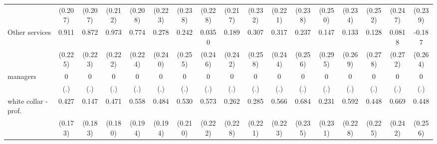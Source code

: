 {\begin{tabular}{l*{16}{c}}
                    &     (0.207)         &     (0.207)         &     (0.212)         &     (0.208)         &     (0.223)         &     (0.238)         &     (0.228)         &     (0.217)         &     (0.232)         &     (0.221)         &     (0.238)         &     (0.250)         &     (0.234)         &     (0.252)         &     (0.247)         &     (0.239)         \\
[1em]
Other services      &       0.911\sym{***}&       0.872\sym{***}&       0.973\sym{***}&       0.774\sym{***}&       0.278         &       0.242         &      0.0350         &       0.189         &       0.307         &       0.317         &       0.237         &       0.147         &       0.133         &       0.128         &      0.0818         &      -0.187         \\
                    &     (0.225)         &     (0.223)         &     (0.222)         &     (0.224)         &     (0.240)         &     (0.255)         &     (0.246)         &     (0.242)         &     (0.258)         &     (0.244)         &     (0.256)         &     (0.295)         &     (0.269)         &     (0.278)         &     (0.272)         &     (0.264)         \\
[1em]
managers            &           0         &           0         &           0         &           0         &           0         &           0         &           0         &           0         &           0         &           0         &           0         &           0         &           0         &           0         &           0         &           0         \\
                    &         (.)         &         (.)         &         (.)         &         (.)         &         (.)         &         (.)         &         (.)         &         (.)         &         (.)         &         (.)         &         (.)         &         (.)         &         (.)         &         (.)         &         (.)         &         (.)         \\
[1em]
white collar - prof.&       0.427\sym{*}  &       0.147         &       0.471\sym{**} &       0.558\sym{**} &       0.484\sym{*}  &       0.530\sym{*}  &       0.573\sym{**} &       0.262         &       0.285         &       0.566\sym{*}  &       0.684\sym{**} &       0.231         &       0.592\sym{**} &       0.448\sym{*}  &       0.669\sym{**} &       0.448         \\
                    &     (0.173)         &     (0.183)         &     (0.180)         &     (0.194)         &     (0.194)         &     (0.210)         &     (0.222)         &     (0.228)         &     (0.221)         &     (0.223)         &     (0.235)         &     (0.231)         &     (0.228)         &     (0.225)         &     (0.242)         &     (0.256)         \\

\end{tabular}}
